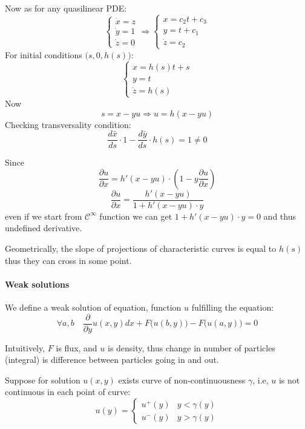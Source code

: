 Now as for any quasilinear PDE:
$$\begin{cases}
\dot{x}= z\\\dot{y} = 1\\\dot{z}= 0
\end{cases} \Rightarrow \begin{cases}
x= c_2 t + c_3\\y = t + c_1\\\dot{z}= c_2
\end{cases} $$
For initial conditions $\Big(s,0,h(s)\Big)$:
$$ \begin{cases}
x= h(s) t + s\\y = t \\\dot{z}= h(s)
\end{cases} $$
Now 
$$s=x-yu \Rightarrow u = h(x-yu)$$
Checking transversality condition:
$$\frac{d\bar{x}}{ds} \cdot 1 - \frac{d\bar{y}}{ds} \cdot h(s) = 1 \neq 0$$  


Since
$$\frac{\partial u}{\partial x} = h'(x-yu) \cdot \left(1 - y\frac{\partial u}{\partial x} \right)$$
$$\frac{\partial u}{\partial x} = \frac{h'(x-yu)}{1+h'(x-yu) \cdot y} $$
even if we start from $\mathcal{C}^\infty$ function we can get $1+h'(x-yu) \cdot y = 0$ and thus undefined derivative.

Geometrically, the slope of projections of characteristic curves is equal to $h(s)$ thus they can cross in some point.

\paragraph{Weak solutions}
We define a weak solution of equation, function $u$  fulfilling the equation:
$$\forall a,b \quad \frac{\partial }{\partial y} u(x,y) dx + F\Big(u(b,y)\Big)-F\Big(u(a,y)\Big) = 0$$

Intuitively, $F$ is flux, and $u$ is density, thus change in number of particles (integral) is difference between particles going in and out.

Suppose for solution $u(x,y)$ exists curve of non-continuousness $\gamma$, i.e, $u$ is not continuous in each point of curve:
$$u(y) = \begin{cases}
u^+(y) & y < \gamma(y)\\
u^-(y) & y > \gamma(y)
\end{cases}$$

